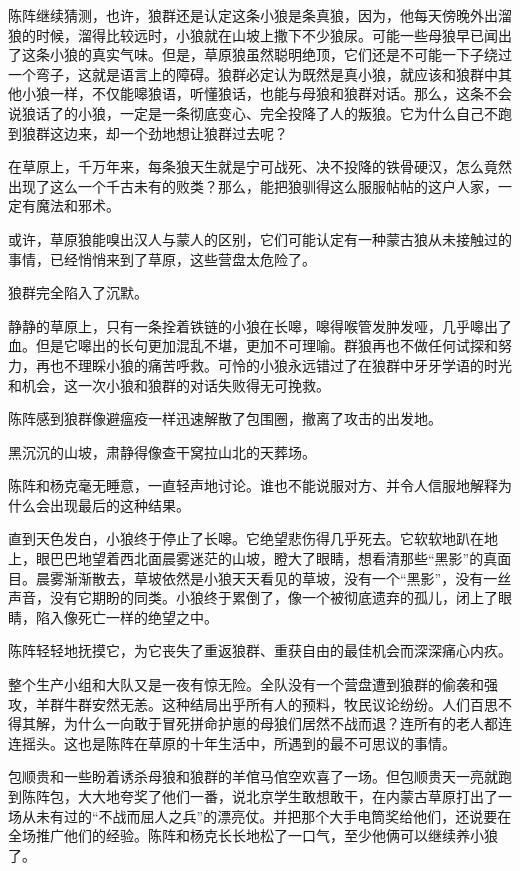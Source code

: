 \par 陈阵继续猜测，也许，狼群还是认定这条小狼是条真狼，因为，他每天傍晚外出溜狼的时候，溜得比较远时，小狼就在山坡上撒下不少狼尿。可能一些母狼早已闻出了这条小狼的真实气味。但是，草原狼虽然聪明绝顶，它们还是不可能一下子绕过一个弯子，这就是语言上的障碍。狼群必定认为既然是真小狼，就应该和狼群中其他小狼一样，不仅能嗥狼语，听懂狼话，也能与母狼和狼群对话。那么，这条不会说狼话了的小狼，一定是一条彻底变心、完全投降了人的叛狼。它为什么自己不跑到狼群这边来，却一个劲地想让狼群过去呢？
\par 在草原上，千万年来，每条狼天生就是宁可战死、决不投降的铁骨硬汉，怎么竟然出现了这么一个千古未有的败类？那么，能把狼驯得这么服服帖帖的这户人家，一定有魔法和邪术。
\par 或许，草原狼能嗅出汉人与蒙人的区别，它们可能认定有一种蒙古狼从未接触过的事情，已经悄悄来到了草原，这些营盘太危险了。
\par 狼群完全陷入了沉默。
\par 静静的草原上，只有一条拴着铁链的小狼在长嗥，嗥得喉管发肿发哑，几乎嗥出了血。但是它嗥出的长句更加混乱不堪，更加不可理喻。群狼再也不做任何试探和努力，再也不理睬小狼的痛苦呼救。可怜的小狼永远错过了在狼群中牙牙学语的时光和机会，这一次小狼和狼群的对话失败得无可挽救。
\par 陈阵感到狼群像避瘟疫一样迅速解散了包围圈，撤离了攻击的出发地。
\par 黑沉沉的山坡，肃静得像查干窝拉山北的天葬场。
\par 
\par 陈阵和杨克毫无睡意，一直轻声地讨论。谁也不能说服对方、并令人信服地解释为什么会出现最后的这种结果。
\par 直到天色发白，小狼终于停止了长嗥。它绝望悲伤得几乎死去。它软软地趴在地上，眼巴巴地望着西北面晨雾迷茫的山坡，瞪大了眼睛，想看清那些“黑影”的真面目。晨雾渐渐散去，草坡依然是小狼天天看见的草坡，没有一个“黑影”，没有一丝声音，没有它期盼的同类。小狼终于累倒了，像一个被彻底遗弃的孤儿，闭上了眼睛，陷入像死亡一样的绝望之中。
\par 陈阵轻轻地抚摸它，为它丧失了重返狼群、重获自由的最佳机会而深深痛心内疚。
\par 整个生产小组和大队又是一夜有惊无险。全队没有一个营盘遭到狼群的偷袭和强攻，羊群牛群安然无恙。这种结局出乎所有人的预料，牧民议论纷纷。人们百思不得其解，为什么一向敢于冒死拼命护崽的母狼们居然不战而退？连所有的老人都连连摇头。这也是陈阵在草原的十年生活中，所遇到的最不可思议的事情。
\par 包顺贵和一些盼着诱杀母狼和狼群的羊倌马倌空欢喜了一场。但包顺贵天一亮就跑到陈阵包，大大地夸奖了他们一番，说北京学生敢想敢干，在内蒙古草原打出了一场从未有过的“不战而屈人之兵”的漂亮仗。并把那个大手电筒奖给他们，还说要在全场推广他们的经验。陈阵和杨克长长地松了一口气，至少他俩可以继续养小狼了。
